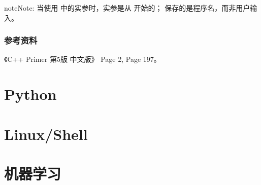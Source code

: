 \documentclass[letterpaper,10pt,english]{sphinxmanual}
\begin{document}
%
\begin{sphinxVerbatim}[commandchars=\\\{\},numbers=left,firstnumber=1,stepnumber=1]
\PYG{p}{[}\PYG{p}{]}  
\PYG{p}{[}\PYG{p}{]}  
\PYG{p}{[}\PYG{p}{]}  
\PYG{p}{[}\PYG{p}{]}  
\PYG{p}{[}\PYG{p}{]}  
\PYG{p}{[}\PYG{p}{]}  
\end{sphinxVerbatim}

\begin{sphinxadmonition}{note}{Note:}
当使用  中的实参时，实参是从  开始的；  保存的是程序名，而非用户输入。
\end{sphinxadmonition}


\subsection{参考资料}
\label{\detokenize{cpp/01_main:id3}}
《C++ Primer 第5版 中文版》 Page 2, Page 197。


\chapter{Python}
\label{\detokenize{python/index:python}}\label{\detokenize{python/index::doc}}

\chapter{Linux/Shell}
\label{\detokenize{linux/index:linux-shell}}\label{\detokenize{linux/index::doc}}

\chapter{机器学习}
\label{\detokenize{machineLearning/index::doc}}\label{\detokenize{machineLearning/index:id1}}
\end{document}
